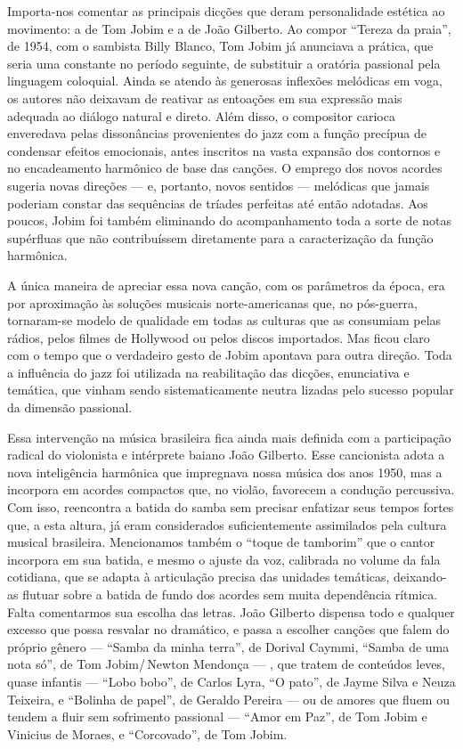 Importa-nos comentar as principais dicções que deram personalidade
estética ao movimento: a de Tom Jobim e a de João Gilberto. Ao compor
``Tereza da praia'', de 1954, com o sambista Billy Blanco, Tom Jobim já
anunciava a prática, que seria uma constante no período seguinte, de
substituir a oratória passional pela linguagem coloquial. Ainda se
atendo às generosas inflexões melódicas em voga, os autores não deixavam
de reativar as entoações em sua expressão mais adequada ao diálogo
natural e direto. Além disso, o compositor carioca enveredava pelas
dissonâncias provenientes do jazz com a função precípua de condensar
efeitos emocionais, antes inscritos na vasta expansão dos contornos e no
encadeamento harmônico de base das canções. O emprego dos novos acordes
sugeria novas direções --- e, portanto, novos sentidos --- melódicas que
jamais poderiam constar das sequências de tríades perfeitas até então
adotadas. Aos poucos, Jobim foi também eliminando do acompanhamento toda
a sorte de notas supérfluas que não contribuíssem diretamente para a
caracterização da função harmônica.

A única maneira de apreciar essa nova canção, com os parâmetros da
época, era por aproximação às soluções musicais norte-americanas que, no
pós-guerra, tornaram-se modelo de qualidade em todas as culturas que as
consumiam pelas rádios, pelos filmes de Hollywood ou pelos discos
importados. Mas ficou claro com o tempo que o verdadeiro gesto de Jobim
apontava para outra direção. Toda a influência do jazz foi utilizada na
reabilitação das dicções, enunciativa e temática, que vinham sendo
sistematicamente neutra lizadas pelo sucesso popular da dimensão
passional.

Essa intervenção na música brasileira fica ainda mais definida com a
participação radical do violonista e intérprete baiano João Gilberto.
Esse cancionista adota a nova inteligência harmônica que impregnava
nossa música dos anos 1950, mas a incorpora em acordes compactos que, no
violão, favorecem a condução percussiva. Com isso, reencontra a batida
do samba sem precisar enfatizar seus tempos fortes que, a esta altura,
já eram considerados suficientemente assimilados pela cultura musical
brasileira. Mencionamos também o ``toque de tamborim'' que o cantor
incorpora em sua batida, e mesmo o ajuste da voz, calibrada no volume da
fala cotidiana, que se adapta à articulação precisa das unidades
temáticas, deixando-as flutuar sobre a batida de fundo dos acordes sem
muita dependência rítmica. Falta comentarmos sua escolha das letras.
João Gilberto dispensa todo e qualquer excesso que possa resvalar no
dramático, e passa a escolher canções que falem do próprio gênero --- ``Samba da minha terra'', de Dorival Caymmi, ``Samba de uma nota só'', de Tom Jobim/\,Newton Mendonça --- , que tratem de conteúdos leves, quase
infantis --- ``Lobo bobo'', de Carlos Lyra, ``O pato'', de Jayme Silva e Neuza Teixeira, e ``Bolinha de papel'', de Geraldo Pereira --- ou de
amores que fluem ou tendem a fluir sem sofrimento passional --- ``Amor em
Paz'', de Tom Jobim e Vinicius de Moraes, e ``Corcovado'', de Tom Jobim.

